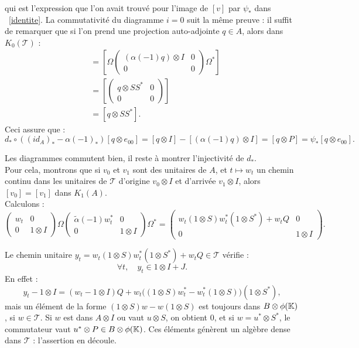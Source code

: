 \begin{dem}
qui est l'expression que l'on avait trouvé pour l'image de $[v]$ par $\psi_*$ dans ~\eqref{identite}. La commutativité du diagramme $i=0$ suit la même preuve : il suffit de remarquer que si l'on prend une projection auto-adjointe $q\in A$, alors dans $K_0(\mathcal T)$ : 
\begin{align*}
[(\alpha(-1)q )\otimes I] & =\left[\Omega\begin{pmatrix}(\alpha(-1)q )\otimes I & 0\\ 0 & 0\end{pmatrix}\Omega^*\right] \\
	& = \left[\begin{pmatrix}q \otimes SS^* & 0\\ 0 & 0\end{pmatrix}\right]\\
	& = [q \otimes SS^*].
\end{align*}
Ceci assure que : \[d_*\circ \left( (id_A)_*-\alpha(-1)_*\right) [q\otimes e_{00}]=[q\otimes I]-[(\alpha(-1)q)\otimes I]=[q\otimes P] =\psi_*[q\otimes e_{00}].\]

Les diagrammes commutent bien, il reste à montrer l'injectivité de $d_*$.\\

Pour cela, montrons que si $v_0$ et $v_1$ sont des unitaires de $A$, et $t\mapsto w_t$ un chemin continu dans les unitaires de $\mathcal T$ d'origine $v_0\otimes I$ et d'arrivée $v_1\otimes I$, alors $[v_0]=[v_1]$ dans $K_1(A)$.\\

Calculons :
\[\begin{pmatrix}w_t & 0 \\ 0 & 1\otimes I\end{pmatrix}\Omega \begin{pmatrix} \tilde{\alpha}(-1)w^*_t & 0 \\ 0 & 1\otimes I\end{pmatrix}\Omega^*
		=\begin{pmatrix}w_t (1\otimes S)w_t^*(1\otimes S^*) + w_t Q& 0 \\ 0 & 1\otimes I\end{pmatrix}.\]

 Le chemin unitaire $y_t=w_t (1\otimes S)w_t^*(1\otimes S^*) + w_t Q\in \mathcal T$ vérifie :
\[\forall t, \quad y_t \in 1\otimes I +J.\]
En effet : 
\[y_t -1\otimes I = (w_t-1\otimes I)Q+w_t\big((1\otimes S)w_t^*-w_t^*(1\otimes S)\big)(1\otimes S^*),\]
mais un élément de la forme $(1\otimes S)w-w(1\otimes S)$ est toujours dans $B\otimes \phi(\mathbb K)$, si $w\in \mathcal T$. Si $w$ est dans $A\otimes I$ ou vaut $u\otimes S$, on obtient $0$, et si $w=u^*\otimes S^*$, le commutateur vaut $u^*\otimes P\in B\otimes \phi(\mathbb K)$. Ces éléments génèrent un algèbre dense dans $\mathcal T$ : l'assertion en découle.\\


\end{dem}
